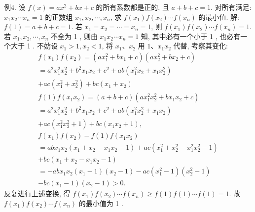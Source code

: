 例4. 设 $f(x)=a x^2+b x+c$ 的所有系数都是正的, 且 $a+b+c=1$. 对所有满足: $x_1 x_2 \cdots x_n=1$ 的正数组 $x_1, x_2, \cdots, x_n$, 求 $f\left(x_1\right) f\left(x_2\right) \cdots f\left(x_n\right)$ 的最小值.
解:$f(1)=a+b+c=1$. 若 $x_1=x_2=\cdots=x_n=1$, 则 $f\left(x_1\right) f\left(x_2\right) \cdots f\left(x_n\right)=1$.
若 $x_1, x_2, \cdots, x_n$ 不全为 1 , 则由 $x_1 x_2 \cdots x_n=1$ 知, 其中必有一个小于 1 , 也必有一个大于 1 . 不妨设 $x_1>1, x_2<1$, 将 $x_1 、 x_2$ 用 $1 、 x_1 x_2$ 代替, 考察其变化:
$$
\begin{gathered}
f\left(x_1\right) f\left(x_2\right)=\left(a x_1^2+b x_1+c\right)\left(a x_2^2+b x_2+c\right) \\
=a^2 x_1^2 x_2^2+b^2 x_1 x_2+c^2+a b\left(x_1^2 x_2+x_1 x_2^2\right) \\
+a c\left(x_1^2+x_2^2\right)+b c\left(x_1+x_2\right) \\
f(1) f\left(x_1 x_2\right)=(a+b+c)\left(a x_1^2 x_2^2+b x_1 x_2+c\right) \\
=a^2 x_1^2 x_2^2+b^2 x_1 x_2+c^2+a b\left(x_1^2 x_2^2+x_1 x_2\right) \\
+a c\left(x_1^2 x_2^2+1\right)+b c\left(x_1 x_2+1\right), \\
f\left(x_1\right) f\left(x_2\right)-f(1) f\left(x_1 x_2\right) \\
=a b x_1 x_2\left(x_1+x_2-x_1 x_2-1\right)+a c\left(x_1^2+x_2^2-x_1^2 x_2^2-1\right) \\
+b c\left(x_1+x_2-x_1 x_2-1\right) \\
=-a b x_1 x_2\left(x_1-1\right)\left(x_2-1\right)-a c\left(x_1^2-1\right)\left(x_2^2-1\right) \\
-b c\left(x_1-1\right)\left(x_2-1\right)>0 .
\end{gathered}
$$
反复进行上述变换, 得 $f\left(x_1\right) f\left(x_2\right) \cdots f\left(x_n\right) \geqslant f(1) f(1) \cdots f(1)=1$. 故
$f\left(x_1\right) f\left(x_2\right) \cdots f\left(x_n\right)$ 的最小值为 1 .



